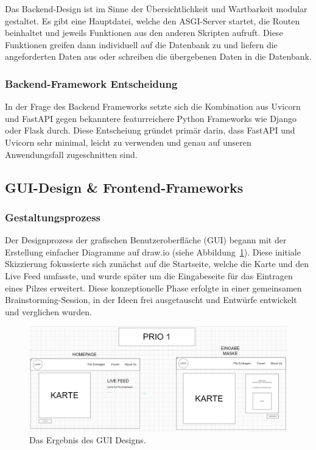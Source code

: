 Das Backend-Design ist im Sinne der Übersichtlichkeit und Wartbarkeit modular gestaltet. Es gibt eine Hauptdatei, welche den ASGI-Server startet, die Routen
beinhaltet und jeweils Funktionen aus den anderen Skripten aufruft. Diese Funktionen greifen dann individuell auf die Datenbank zu und liefern die angeforderten
Daten aus oder schreiben die übergebenen Daten in die Datenbank.

\subsubsection{Backend-Framework Entscheidung}

In der Frage des Backend Frameworks setzte sich die Kombination aus Uvicorn und FastAPI gegen bekanntere featurreichere Python Frameworks wie Django oder Flask
durch. Diese Entscheiung gründet primär darin, dass FastAPI und Uvicorn sehr minimal, leicht zu verwenden und genau auf unseren Anwendungsfall zugeschnitten sind.

\subsection{GUI-Design \& Frontend-Frameworks}

\subsubsection{Gestaltungsprozess}

Der Designprozess der grafischen Benutzeroberfläche (GUI) begann mit der Erstellung einfacher Diagramme auf draw.io
(siehe Abbildung~\ref{fig:GUI_Entwurf}). Diese initiale Skizzierung fokussierte sich zunächst auf die Startseite, welche
die Karte und den Live Feed umfasste, und wurde später um die Eingabeseite für das Eintragen eines Pilzes erweitert. Diese
konzeptionelle Phase erfolgte in einer gemeinsamen Brainstorming-Session, in der Ideen frei ausgetauscht und Entwürfe
entwickelt und verglichen wurden.

\begin{figure}[ht]
	\centering
	\includegraphics[width=\textwidth]{abbildungen/GuiEntwurfDrawio.jpg}
	\caption{Das Ergebnis des GUI Designs.}
	\label{fig:GUI_Entwurf}
\end{figure}

